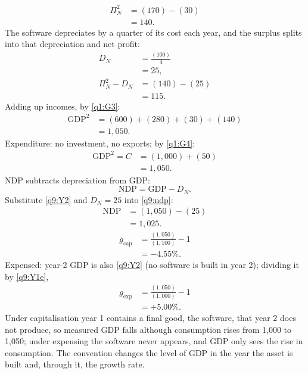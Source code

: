 \begin{sol}
\begin{align*}
\Pi^2_N &= (170)-(30)\\
&= 140 .
\end{align*}
The software depreciates by a quarter of its cost each year, and the surplus splits into that depreciation and net profit:
\begin{align*}
D_N &= \frac{(100)}{4}\\
&= 25,\\
\Pi^2_N-D_N &= (140)-(25)\\
&= 115 .
\end{align*}
Adding up incomes, by \eqref{q1:G3}:
\begin{align*}
\text{GDP}^2 &= (600)+(280)+(30)+(140)\\
&= 1{,}050 .
\end{align*}
Expenditure: no investment, no exports; by \eqref{q1:G4}:
\begin{align*}
\text{GDP}^2=C &= (1{,}000)+(50)\\
&= 1{,}050 .
\end{align*}
NDP subtracts depreciation from GDP:
\begin{equation}
\text{NDP}=\text{GDP}-D_N. \label{q9:ndp}
\end{equation}
Substitute \eqref{q9:Y2} and $D_N=25$ into \eqref{q9:ndp}:
\begin{align*}
\text{NDP} &= (1{,}050)-(25)\\
&= 1{,}025 .
\end{align*}
\begin{align*}
g_{\mathrm{cap}} &= \frac{(1{,}050)}{(1{,}100)}-1\\
&= -4.55\% .
\end{align*}
Expensed: year-2 GDP is also \eqref{q9:Y2} (no software is built in year 2); dividing it by \eqref{q9:Y1e},
\begin{align*}
g_{\mathrm{exp}} &= \frac{(1{,}050)}{(1{,}000)}-1\\
&= +5.00\% .
\end{align*}
Under capitalisation year 1 contains a final good, the software, that year 2 does not produce, so
measured GDP falls although consumption rises from 1{,}000 to 1{,}050; under expensing the software never appears, and GDP only
sees the rise in consumption. The convention changes the level of GDP in the year the asset is built and, through it, the growth rate.
\end{sol}
